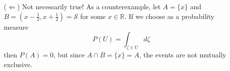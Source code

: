 \documentclass{article}
\begin{document}
\begin{enumerate}[label=(\alph*)]
{\begin{itemize}
          {
            Let $A$ and $B$ be mutually exclusive and statistically 
            independent. Since they are mutually exclusive, 
            $A \cap B = \varnothing$, so $P(A \cap B) = P(\varnothing) = 0$. 
            Since they are independent, $P(A \cap B) = P(A)P(B)$. But if 
            $P(A)P(B) = 0$ then either $P(A) = 0$ or $P(A) = 0$. Therefore,
            if $A$ and $B$ are both mutually exclusive and independent, then
            $P(A) = 0$ or $P(B) = 0$.
          }
          \item[($\Leftarrow$)]
          { Not necessarily true! As a counterexample, let $A = \{x\}$ and
            $B = (x-\frac{1}{2}, x+\frac{1}{2}) = \mathcal{S}$ for some 
            $x \in \mathbb{R}$. 
            If we choose as a probability measure
            $$
            P(U) = \int_{\zeta \in U} d\zeta
            $$
            then $P(A) = 0$, but since $A \cap B = \{ x \} = A$, the events
            are not mutually exclusive. 
          }
        \end{itemize}
       }
\end{enumerate}
\end{document}
